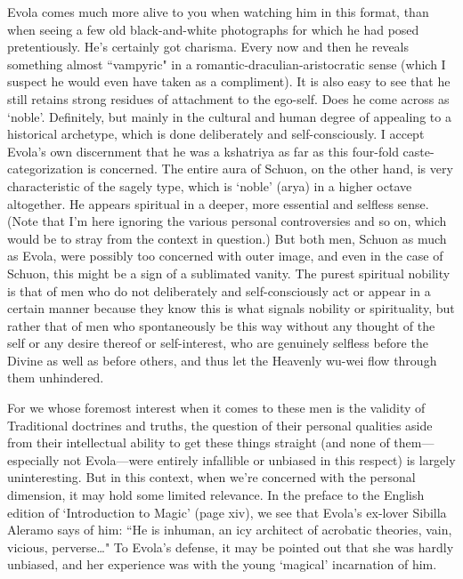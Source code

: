 \begin{footnotesize}
\begin{sffamily}
Evola comes much more alive to you when watching him in this format, than when seeing a few old black-and-white photographs for which he had posed pretentiously. He's certainly got charisma. Every now and then he reveals something almost ``vampyric" in a romantic-draculian-aristocratic sense (which I suspect he would even have taken as a compliment). It is also easy to see that he still retains strong residues of attachment to the ego-self. Does he come across as `noble'. Definitely, but mainly in the cultural and human degree of appealing to a historical archetype, which is done deliberately and self-consciously. I accept Evola's own discernment that he was a kshatriya as far as this four-fold caste-categorization is concerned. The entire aura of Schuon, on the other hand, is very characteristic of the sagely type, which is `noble' (arya) in a higher octave altogether. He appears spiritual in a deeper, more essential and selfless sense. (Note that I'm here ignoring the various personal controversies and so on, which would be to stray from the context in question.) But both men, Schuon as much as Evola, were possibly too concerned with outer image, and even in the case of Schuon, this might be a sign of a sublimated vanity. The purest spiritual nobility is that of men who do not deliberately and self-consciously act or appear in a certain manner because they know this is what signals nobility or spirituality, but rather that of men who spontaneously be this way without any thought of the self or any desire thereof or self-interest, who are genuinely selfless before the Divine as well as before others, and thus let the Heavenly wu-wei flow through them unhindered.

For we whose foremost interest when it comes to these men is the validity of Traditional doctrines and truths, the question of their personal qualities aside from their intellectual ability to get these things straight (and none of them—especially not Evola—were entirely infallible or unbiased in this respect) is largely uninteresting. But in this context, when we're concerned with the personal dimension, it may hold some limited relevance. In the preface to the English edition of `Introduction to Magic' (page xiv), we see that Evola's ex-lover Sibilla Aleramo says of him: ``He is inhuman, an icy architect of acrobatic theories, vain, vicious, perverse…" To Evola's defense, it may be pointed out that she was hardly unbiased, and her experience was with the young `magical' incarnation of him.


\end{sffamily}
\end{footnotesize}
